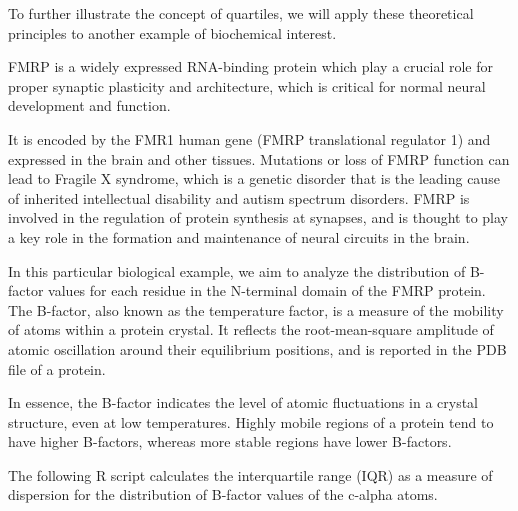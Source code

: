 \documentclass[
  letterpaper,
  DIV=11,
  numbers=noendperiod]{scrreprt}
\begin{document}
To further illustrate the concept of quartiles, we will apply these
theoretical principles to another example of biochemical interest.

\begin{tcolorbox}[enhanced jigsaw, arc=.35mm, breakable, toptitle=1mm, opacityback=0, bottomrule=.15mm, toprule=.15mm, rightrule=.15mm, titlerule=0mm, opacitybacktitle=0.6, coltitle=black, left=2mm, title=\textcolor{quarto-callout-tip-color}{\faLightbulb}\hspace{0.5em}{Biological focus: FMRP (Fragile X Mental Retardation Protein)}, bottomtitle=1mm, leftrule=.75mm, colback=white, colbacktitle=quarto-callout-tip-color!10!white, colframe=quarto-callout-tip-color-frame]

FMRP is a widely expressed RNA-binding protein which play a crucial role
for proper synaptic plasticity and architecture, which is critical for
normal neural development and function.

It is encoded by the FMR1 human gene (FMRP translational regulator 1)
and expressed in the brain and other tissues. Mutations or loss of FMRP
function can lead to Fragile X syndrome, which is a genetic disorder
that is the leading cause of inherited intellectual disability and
autism spectrum disorders. FMRP is involved in the regulation of protein
synthesis at synapses, and is thought to play a key role in the
formation and maintenance of neural circuits in the brain.

\end{tcolorbox}

In this particular biological example, we aim to analyze the
distribution of B-factor values for each residue in the N-terminal
domain of the FMRP protein. The B-factor, also known as the temperature
factor, is a measure of the mobility of atoms within a protein crystal.
It reflects the root-mean-square amplitude of atomic oscillation around
their equilibrium positions, and is reported in the PDB file of a
protein.

In essence, the B-factor indicates the level of atomic fluctuations in a
crystal structure, even at low temperatures. Highly mobile regions of a
protein tend to have higher B-factors, whereas more stable regions have
lower B-factors.

The following R script calculates the interquartile range (IQR) as a
measure of dispersion for the distribution of B-factor values of the
c-alpha atoms.
\end{document}
